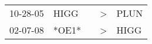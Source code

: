 \begin{supertabular}{p{0.07\textwidth}p{0.06\textwidth}p{0.02\textwidth}p{0.02\textwidth}p{0.06\textwidth}}
 10-28-05\textsuperscript{} &  HIGG\textsuperscript{} &   &  \textgreater &  PLUN\textsuperscript{} \\
 02-07-08\textsuperscript{} &                   *OE1* &   &  \textgreater &  HIGG\textsuperscript{} \\
\end{supertabular}
